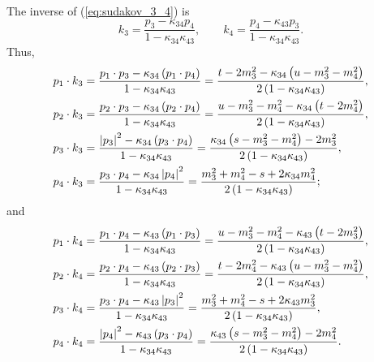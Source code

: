 The inverse of (\ref{eq:sudakov_3_4}) is
\begin{equation}
	k_{3} = \frac{p_{3} - \kappa_{34} p_{4}}{1 - \kappa_{34} \kappa_{43}}, \qquad k_{4} = \frac{p_{4} - \kappa_{43} p_{3}}{1 - \kappa_{34} \kappa_{43}}.
\end{equation}
Thus,
\begin{align}
	p_{1} \cdot k_{3} &= \frac{p_{1} \cdot p_{3} - \kappa_{34} \left( p_{1} \cdot p_{4} \right)}{1 - \kappa_{34} \kappa_{43}} = \frac{ t - 2m_{3}^{2} - \kappa_{34} \left( u - m_{3}^{2} - m_{4}^{2} \right) }{2 \left(1 - \kappa_{34} \kappa_{43} \right)}, \\
	p_{2} \cdot k_{3} &= \frac{p_{2} \cdot p_{3} - \kappa_{34} \left( p_{2} \cdot p_{4} \right)}{1 - \kappa_{34} \kappa_{43}} = \frac{ u - m_{3}^{2} - m_{4}^{2} - \kappa_{34} \left( t - 2m_{4}^{2} \right) }{2 \left(1 - \kappa_{34} \kappa_{43} \right)}, \\
	p_{3} \cdot k_{3} &= \frac{\left\lvert p_{3} \right\rvert^{2} - \kappa_{34} \left( p_{3} \cdot p_{4} \right)}{1 - \kappa_{34} \kappa_{43}} = \frac{ \kappa_{34} \left( s - m_{3}^{2} - m_{4}^{2} \right) - 2m_{3}^{2} }{2 \left(1 - \kappa_{34} \kappa_{43} \right)}, \\
	p_{4} \cdot k_{3} &= \frac{p_{3} \cdot p_{4} - \kappa_{34} \left\lvert p_{4} \right\rvert^{2}}{1 - \kappa_{34} \kappa_{43}} = \frac{ m_{3}^{2} + m_{4}^{2} - s + 2 \kappa_{34} m_{4}^{2} }{2 \left(1 - \kappa_{34} \kappa_{43} \right)};
\end{align}
and
\begin{align}
	p_{1} \cdot k_{4} &= \frac{p_{1} \cdot p_{4} - \kappa_{43} \left( p_{1} \cdot p_{3} \right)}{1 - \kappa_{34} \kappa_{43}} = \frac{u - m_{3}^{2} - m_{4}^{2} - \kappa_{43} \left(t - 2 m_{3}^{2} \right)}{2 \left( 1 - \kappa_{34} \kappa_{43} \right)}, \\
	p_{2} \cdot k_{4} &= \frac{p_{2} \cdot p_{4} - \kappa_{43} \left( p_{2} \cdot p_{3} \right)}{1 - \kappa_{34} \kappa_{43}} = \frac{t - 2m_{4}^{2} - \kappa_{43} \left( u - m_{3}^{2} - m_{4}^{2} \right)}{2 \left( 1 - \kappa_{34} \kappa_{43} \right)}, \\
	p_{3} \cdot k_{4} &= \frac{p_{3} \cdot p_{4} - \kappa_{43} \left\lvert p_{3} \right\rvert^{2}}{1 - \kappa_{34} \kappa_{43}} = \frac{m_{3}^{2} + m_{4}^{2} - s + 2 \kappa_{43} m_{3}^{2} }{2 \left( 1 - \kappa_{34} \kappa_{43} \right)}, \\
	p_{4} \cdot k_{4} &= \frac{ \left\lvert p_{4} \right\rvert^{2} - \kappa_{43} \left( p_{3} \cdot p_{4} \right)}{1 - \kappa_{34} \kappa_{43}} = \frac{\kappa_{43} \left( s - m_{3}^{2} - m_{4}^{2} \right) - 2 m_{4}^{2}}{2 \left( 1 - \kappa_{34} \kappa_{43} \right)}.
\end{align}
